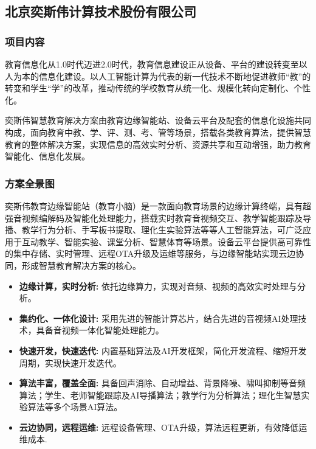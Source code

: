 \subsection{北京奕斯伟计算技术股份有限公司}\label{北京奕斯伟计算技术股份有限公司}

\subsubsection{项目内容}

教育信息化从1.0时代迈进2.0时代，教育信息建设正从设备、平台的建设转变至以人为本的信息化建设。以人工智能计算为代表的新一代技术不断地促进教师“教”的转变和学生“学”的改革，推动传统的学校教育从统一化、规模化转向定制化、个性化。

奕斯伟智慧教育解决方案由教育边缘智能站、设备云平台及配套的信息化设施共同构成，面向教育中教、学、评、测、考、管等场景，搭载各类教育算法，提供智慧教育的整体解决方案，实现信息的高效实时分析、资源共享和互动增强，助力教育智能化、信息化发展。

\subsubsection{方案全景图}

奕斯伟教育边缘智能站（教育小脑）是一款面向教育场景的边缘计算终端，具有超强音视频编解码及智能化处理能力，搭载实时教育音视频交互、教学智能跟踪及导播、教学行为分析、手写板书提取、理化生实验算法等等人工智能算法，可广泛应用于互动教学、智能实验、课堂分析、智慧体育等场景。设备云平台提供高可靠性的集中存储、实时管理、远程OTA升级及运维等服务，与边缘智能站实现云边协同，形成智慧教育解决方案的核心。

\begin{itemize}
    \item \textbf{边缘计算，实时分析:} 依托边缘算力，实现对音频、视频的高效实时处理与分析。
    \item \textbf{集约化、一体化设计:} 采用先进的智能计算芯片，结合先进的音视频AI处理技术，具备音视频一体化智能处理能力。
    \item \textbf{快速开发，快速迭代:} 内置基础算法及AI开发框架，简化开发流程、缩短开发周期，实现快速开发迭代。
    \item \textbf{算法丰富，覆盖全面:} 具备回声消除、自动增益、背景降噪、啸叫抑制等音频算法；学生、老师智能跟踪及AI导播算法；教学行为分析算法；理化生智慧实验算法等多个场景AI算法。
    \item \textbf{云边协同，远程运维:} 远程设备管理、OTA升级，算法远程更新，有效降低运维成本.
\end{itemize}


